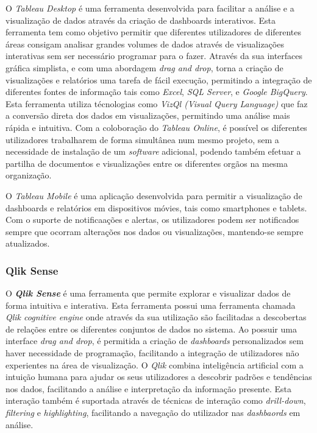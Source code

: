 O \textit{Tableau Desktop} é uma ferramenta desenvolvida para facilitar a análise e a visualização de dados através da criação de dashboards interativos. Esta ferramenta tem como objetivo permitir que diferentes utilizadores de diferentes áreas consigam analisar grandes volumes de dados através de visualizações interativas sem ser necessário programar para o fazer. Através da sua interfaces gráfica simplista, e com uma abordagem \textit{drag and drop}, torna a criação de visualizações e relatórios uma tarefa de fácil execução, permitindo a integração de diferentes fontes de informação tais como \textit{Excel}, \textit{SQL Server}, e \textit{Google BigQuery}. Esta ferramenta utiliza técnologias como \textit{VizQl (Visual Query Language)} que faz a conversão direta dos dados em visualizações, permitindo uma análise mais rápida e intuitiva. Com a coloboração do \textit{Tableau Online}, é possível os diferentes utilizadores trabalharem de forma simultânea num mesmo projeto, sem a necessidade de instalação de um \textit{software} adicional, podendo também efetuar a partilha de documentos e visualizações entre os diferentes orgãos na mesma organização.

O \textit{Tableau Mobile} é uma aplicação desenvolvida para permitir a visualização de dashboards e relatórios em dispositivos móvies, tais como smartphones e tablets. Com o suporte de notificaações e alertas, os utilizadores podem ser notificados sempre que ocorram alterações nos dados ou visualizações, mantendo-se sempre atualizados.

\subsubsection{Qlik Sense} %
\label{ssub:qlik}

O \textbf{\textit{Qlik Sense}} \cite{qlik} é uma ferramenta que permite explorar e visualizar dados de forma intuitiva e interativa. Esta ferramenta possui uma ferramenta chamada \textit{Qlik cognitive engine} onde através da sua utilização são facilitadas a descobertas de relações entre os diferentes conjuntos de dados no sistema. Ao possuir uma interface \textit{drag and drop}, é permitida a criação de \textit{dashboards} personalizados sem haver necessidade de programação, facilitando a integração de utilizadores não experientes na área de visualização. O \textit{Qlik} combina inteligência artificial com a intuição humana para ajudar os seus utilizadores a descobrir padrões e tendências nos dados, facilitando a análise e interpretação da informação presente. Esta interação também é suportada através de técnicas de interação como \textit{drill-down}, \textit{filtering} e \textit{highlighting}, facilitando a navegação do utilizador nas \textit{dashbaords} em análise. 

